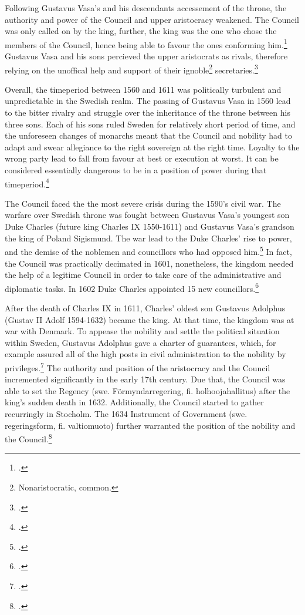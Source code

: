 Following Gustavus Vasa's and his descendants accessement of the throne, the authority and power of the Council and upper aristocracy weakened. The Council was only called on by the king, further, the king was the one who chose the members of the Council, hence being able to favour the ones conforming him.\footcite[p. 58.]{pSuurvalta} Gustavus Vasa and his sons percieved the upper aristocrats as rivals, therefore relying on the unoffical help and support of their ignoble\footnote{Nonaristocratic, common.} secretaries.\footcite[p. 53.]{HakanenAKoskinen2017}

Overall, the timeperiod between 1560 and 1611 was politically turbulent and unpredictable in the Swedish realm. The passing of Gustavus Vasa in 1560 lead to the bitter rivalry and struggle over the inheritance of the throne between his three sons. Each of his sons ruled Sweden for relatively short period of time, and the unforeseen changes of monarchs meant that the Council and nobility had to adapt and swear allegiance to the right sovereign at the right time. Loyalty to the wrong party lead to fall from favour at best or execution at worst. It can be considered essentially dangerous to be in a position of power during that timeperiod.\footcites[pp. 96-121,]{pSuurvalta}[pp. 51-52.]{HakanenAKoskinen2017}

The Council faced the the most severe crisis during the 1590's civil war. The warfare over Swedish throne was fought between Gustavus Vasa's youngest son Duke Charles (future king Charles IX 1550-1611) and Gustavus Vasa's grandson the king of Poland Sigismund. The war lead to the Duke Charles' rise to power, and the demise of the noblemen and councillors who had opposed him.\footcites[pp. 57-60,]{HakanenAKoskinen2017}[pp. 96-121.]{pSuurvalta} In fact, the Council was practically decimated in 1601, nonetheless, the kingdom needed the help of a legitime Council in order to take care of the administrative and diplomatic tasks. In 1602 Duke Charles appointed 15 new councillors.\footcite[pp. 57-59.]{HakanenAKoskinen2017}

After the death of Charles IX in 1611, Charles' oldest son Gustavus Adolphus (Gustav II Adolf 1594-1632) became the king. At that time, the kingdom was at war with Denmark. To appease the nobility and settle the political situation within Sweden, Gustavus Adolphus gave a charter of guarantees, which, for example assured all of the high posts in civil administration to the nobility by privileges.\footcites[pp. 121-123,]{pSuurvalta}[pp. 8-9.]{personalAgency} The authority and position of the aristocracy and the Council incremented significantly in the early 17th century. Due that, the Council was able to set the Regency (swe. Förmyndarregering, fi. holhoojahallitus) after the king's sudden death in 1632. Additionally, the Council started to gather recurringly in Stocholm. The 1634 Instrument of Government (swe. regeringsform, fi. valtiomuoto) further warranted the position of the nobility and the Council.\footcites[pp. 195-197,]{pSuurvalta}[pp. 16-17,]{agencyAndStateBuilding}[pp. 8-9.]{personalAgency}

